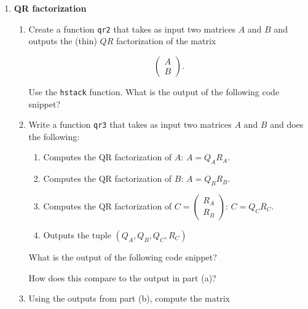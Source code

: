 \documentclass{article}
\begin{document}
\pagestyle{fancy}
\begin{enumerate}

\item \textbf{QR factorization}
\begin{enumerate}
\item Create a function \texttt{qr2} that takes as input two matrices $A$ and $B$ and outputs the (thin) $QR$ factorization of the matrix 

\[
\begin{pmatrix} A \\ B\end{pmatrix}.
\]

Use the \texttt{hstack} function.  What is the output of the following code snippet?

\vspace{0.5cm}


\end{enumerate}

\begin{enumerate}
\setcounter{enumii}{1}
\item Write a function \texttt{qr3} that takes as input two matrices $A$ and $B$ and does the following:

\begin{enumerate}
\item Computes the QR factorization of $A$: $A = Q_AR_A$.
\item Computes the QR factorization of $B$: $A = Q_BR_B$.
\item Computes the QR factorization of $C = \begin{pmatrix}R_A \\ R_B \end{pmatrix}$: $C = Q_CR_C$.
\item Outputs the tuple $(Q_A, Q_B, Q_C, R_C)$
\end{enumerate}

\vspace{0.5cm}

What is the output of the following code snippet?

\vspace{0.5cm}


How does this compare to the output in part (a)?

\end{enumerate}

\begin{enumerate}
\setcounter{enumii}{2}
\item Using the outputs from part (b), compute the matrix


\end{enumerate}
\end{enumerate}
\end{document}

